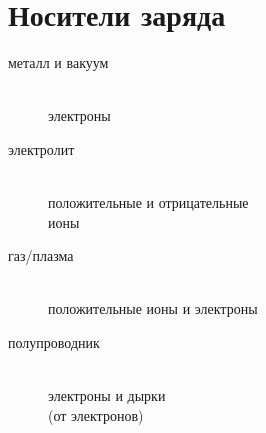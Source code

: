 \documentclass[oneside,12pt]{article}
\begin{document}
\setcounter{section}{0}
\section{Носители заряда}

\color{lightgreen}
\begin{description}
    \item[металл и вакуум]\ \\ электроны
    \item[электролит]\ \\ положительные и отрицательные\\ ионы 
    \item[газ/плазма]\ \\ положительные ионы и электроны
    \item[полупроводник]\ \\ электроны и дырки\\ (от электронов)
\end{description}
\end{document}

